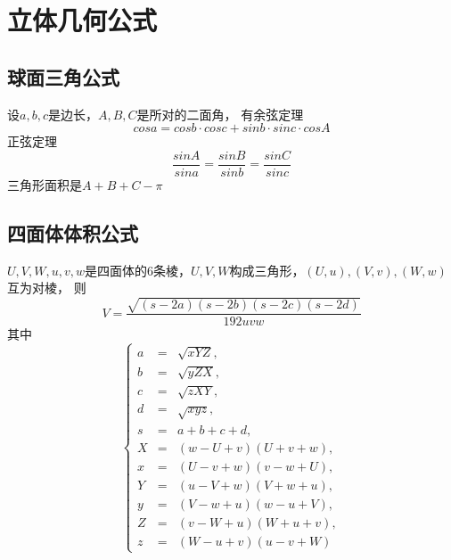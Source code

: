 \section{立体几何公式}
\subsection{球面三角公式}
	设$a, b, c$是边长，$A, B, C$是所对的二面角，
	有余弦定理$$cos a = cos b \cdot cos c + sin b \cdot sin c \cdot cos A$$
	正弦定理$$\frac{sin A}{sin a} = \frac{sin B}{sin b} = \frac{sin C}{sin c}$$
	三角形面积是$A + B + C - \pi$
\subsection{四面体体积公式}
	$U, V, W, u, v, w$是四面体的$6$条棱，$U, V, W$构成三角形，$(U, u), (V, v), (W, w)$互为对棱，
	则$$V = \frac{\sqrt{(s - 2a)(s - 2b)(s - 2c)(s - 2d)}}{192 uvw}$$
	其中$$\left\{\begin{array}{lll}
			a & = & \sqrt{xYZ}, \\
			b & = & \sqrt{yZX}, \\
			c & = & \sqrt{zXY}, \\
			d & = & \sqrt{xyz}, \\
			s & = & a + b + c + d, \\ 
			X & = & (w - U + v)(U + v + w), \\
			x & = & (U - v + w)(v - w + U), \\
			Y & = & (u - V + w)(V + w + u), \\
			y & = & (V - w + u)(w - u + V), \\
			Z & = & (v - W + u)(W + u + v), \\
			z & = & (W - u + v)(u - v + W)
		\end{array}\right.$$
